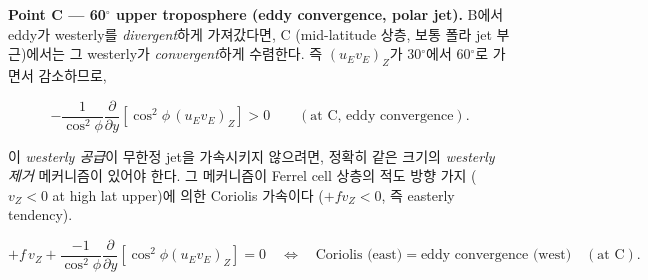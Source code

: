 

\medskip



\noindent\textbf{Point C --- 60$^\circ$ upper troposphere (eddy convergence, polar jet).}
B에서 eddy가 westerly를 \emph{divergent}하게 가져갔다면, C (mid-latitude 상층,
보통 폴라 jet 부근)에서는 그 westerly가 \emph{convergent}하게 수렴한다.
즉 $(u_E v_E)_Z$가 30$^\circ$에서 60$^\circ$로 가면서 감소하므로,

\begin{equation}\label{eq:ch07_temp_pointC_eddy}
  -\frac{1}{\cos^2\phi}\frac{\partial}{\partial y}
    \left[\cos^2\phi\,(u_E v_E)_Z\right] > 0 \qquad (\text{at C, eddy convergence}).
\end{equation}

\noindent
이 \emph{westerly 공급}이 무한정 jet을 가속시키지 않으려면, 정확히 같은 크기의
\emph{westerly 제거} 메커니즘이 있어야 한다.  그 메커니즘이 Ferrel cell
상층의 적도 방향 가지 ($v_Z < 0$ at high lat upper)에 의한 Coriolis 가속이다
($+fv_Z < 0$, 즉 easterly tendency).

\begin{equation}\label{eq:ch07_temp_pointC_bal}
  \boxed{
    +f\,v_Z + \frac{-1}{\cos^2\phi}\frac{\partial}{\partial y}
      [\cos^2\phi(u_E v_E)_Z] = 0
    \quad\Leftrightarrow\quad
    \text{Coriolis (east)} = \text{eddy convergence (west)}
    \quad(\text{at C}).
  }
\end{equation}



